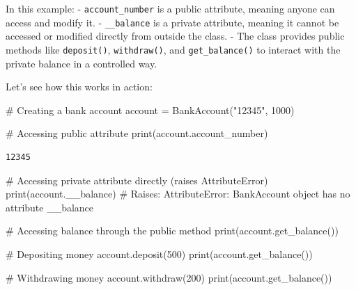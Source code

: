 \documentclass[
  letterpaper,
  DIV=11,
  numbers=noendperiod]{scrreprt}
\newenvironment{Shaded}{\begin{snugshade}}{\end{snugshade}}
\newcommand{\BuiltInTok}[1]{\textcolor[rgb]{0.00,0.23,0.31}{#1}}
\newcommand{\CommentTok}[1]{\textcolor[rgb]{0.37,0.37,0.37}{#1}}
\newcommand{\DecValTok}[1]{\textcolor[rgb]{0.68,0.00,0.00}{#1}}
\newcommand{\NormalTok}[1]{\textcolor[rgb]{0.00,0.23,0.31}{#1}}
\newcommand{\OperatorTok}[1]{\textcolor[rgb]{0.37,0.37,0.37}{#1}}
\newcommand{\StringTok}[1]{\textcolor[rgb]{0.13,0.47,0.30}{#1}}
\begin{document}
In this example: - \texttt{account\_number} is a public attribute,
meaning anyone can access and modify it. - \texttt{\_\_balance} is a
private attribute, meaning it cannot be accessed or modified directly
from outside the class. - The class provides public methods like
\texttt{deposit()}, \texttt{withdraw()}, and \texttt{get\_balance()} to
interact with the private balance in a controlled way.

Let's see how this works in action:

\begin{Shaded}
\begin{Highlighting}[]
\CommentTok{\# Creating a bank account}
\NormalTok{account }\OperatorTok{=}\NormalTok{ BankAccount(}\StringTok{"12345"}\NormalTok{, }\DecValTok{1000}\NormalTok{)}

\CommentTok{\# Accessing public attribute}
\BuiltInTok{print}\NormalTok{(account.account\_number)  }
\end{Highlighting}
\end{Shaded}

\begin{verbatim}
12345
\end{verbatim}

\begin{Shaded}
\begin{Highlighting}[]

\CommentTok{\# Accessing private attribute directly (raises AttributeError)}
\BuiltInTok{print}\NormalTok{(account.\_\_balance)  }\CommentTok{\# Raises: AttributeError: \textquotesingle{}BankAccount\textquotesingle{} object has no attribute \textquotesingle{}\_\_balance\textquotesingle{}}
\end{Highlighting}
\end{Shaded}

\begin{Shaded}
\begin{Highlighting}[]
\CommentTok{\# Accessing balance through the public method}
\BuiltInTok{print}\NormalTok{(account.get\_balance())  }

\CommentTok{\# Depositing money}
\NormalTok{account.deposit(}\DecValTok{500}\NormalTok{)}
\BuiltInTok{print}\NormalTok{(account.get\_balance()) }

\CommentTok{\# Withdrawing money}
\NormalTok{account.withdraw(}\DecValTok{200}\NormalTok{)}
\BuiltInTok{print}\NormalTok{(account.get\_balance())  }
\end{Highlighting}
\end{Shaded}
\end{document}
